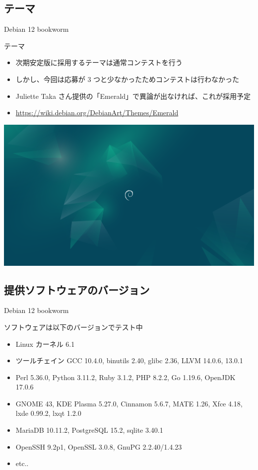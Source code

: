 \subsection{テーマ}


\begin{frame}{Debian 12 bookworm}%

テーマ

\begin{itemize}
\item 次期安定版に採用するテーマは通常コンテストを行う
\item しかし、今回は応募が 3 つと少なかったためコンテストは行わなかった
\item Juliette Taka さん提供の「Emerald」で異論が出なければ、これが採用予定
\item \url{https://wiki.debian.org/DebianArt/Themes/Emerald}
\end{itemize}

\begin{center}
  \includegraphics[width=0.60\hsize]{image202303/Emerald-wallpaper_1920x1080.png}
\end{center}

\end{frame}


\subsection{提供ソフトウェアのバージョン}


\begin{frame}{Debian 12 bookworm}%

ソフトウェアは以下のバージョンでテスト中

\begin{itemize}
\item Linux カーネル 6.1
\item ツールチェイン GCC 10.4.0, binutils 2.40, glibc 2.36, LLVM 14.0.6, 13.0.1
\item Perl 5.36.0, Python 3.11.2, Ruby 3.1.2, PHP 8.2.2, Go 1.19.6, OpenJDK 17.0.6
\item GNOME 43, KDE Plasma 5.27.0, Cinnamon 5.6.7, MATE 1.26, Xfce 4.18, lxde 0.99.2, lxqt 1.2.0
\item MariaDB 10.11.2, PostgreSQL 15.2, sqlite 3.40.1 
\item OpenSSH 9.2p1, OpenSSL 3.0.8, GnuPG 2.2.40/1.4.23
\item etc..
\end{itemize}

\end{frame}


